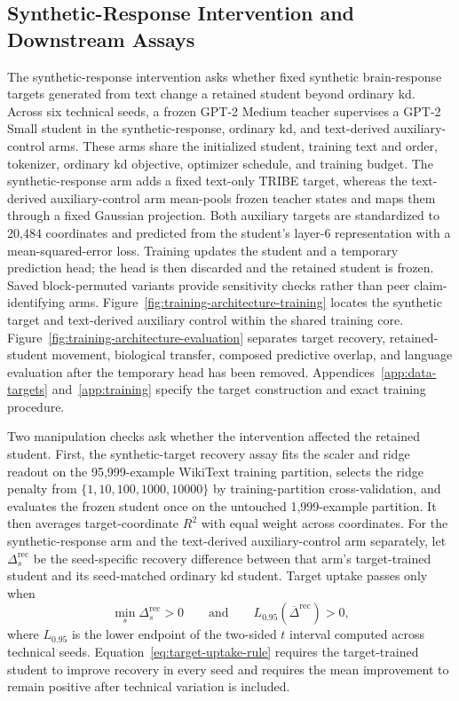 \FloatBarrier
\subsection{Synthetic-Response Intervention and Downstream Assays}
\label{sec:synthetic-intervention}

The synthetic-response intervention asks whether fixed synthetic brain-response targets generated from text change a retained student beyond ordinary \ac{kd}.
Across six technical seeds, a frozen GPT-2 Medium teacher supervises a GPT-2 Small student in the synthetic-response, ordinary \ac{kd}, and text-derived auxiliary-control arms.
These arms share the initialized student, training text and order, tokenizer, ordinary \ac{kd} objective, optimizer schedule, and training budget.
The synthetic-response arm adds a fixed text-only TRIBE target, whereas the text-derived auxiliary-control arm mean-pools frozen teacher states and maps them through a fixed Gaussian projection.
Both auxiliary targets are standardized to 20,484 coordinates and predicted from the student's layer-6 representation with a mean-squared-error loss.
Training updates the student and a temporary prediction head; the head is then discarded and the retained student is frozen.
Saved block-permuted variants provide sensitivity checks rather than peer claim-identifying arms.
Figure~\ref{fig:training-architecture-training} locates the synthetic target and text-derived auxiliary control within the shared training core.
Figure~\ref{fig:training-architecture-evaluation} separates target recovery, retained-student movement, biological transfer, composed predictive overlap, and language evaluation after the temporary head has been removed.
Appendices~\ref{app:data-targets} and~\ref{app:training} specify the target construction and exact training procedure.

Two manipulation checks ask whether the intervention affected the retained student.
First, the synthetic-target recovery assay fits the scaler and ridge readout on the 95,999-example WikiText training partition, selects the ridge penalty from \(\{1,10,100,1000,10000\}\) by training-partition cross-validation, and evaluates the frozen student once on the untouched 1,999-example partition.
It then averages target-coordinate \(R^2\) with equal weight across coordinates.
For the synthetic-response arm and the text-derived auxiliary-control arm separately, let \(\Delta_s^{\mathrm{rec}}\) be the seed-specific recovery difference between that arm's target-trained student and its seed-matched ordinary \ac{kd} student.
Target uptake passes only when
\begin{equation}
\min_s \Delta_s^{\mathrm{rec}} > 0 %
\qquad\text{and}\qquad
L_{0.95}\!\left(\overline{\Delta}^{\mathrm{rec}}\right) > 0, %
\label{eq:target-uptake-rule}
\end{equation}
where \(L_{0.95}\) is the lower endpoint of the two-sided \(t\) interval computed across technical seeds.
Equation~\ref{eq:target-uptake-rule} requires the target-trained student to improve recovery in every seed and requires the mean improvement to remain positive after technical variation is included.


